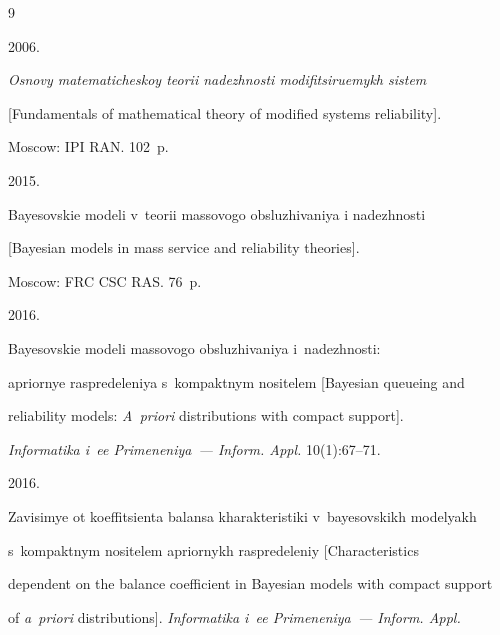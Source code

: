 {\small\frenchspacing


{%




\begin{thebibliography}{9}







 2006. 


\textit{Osnovy matematicheskoy teorii nadezhnosti modifitsiruemykh sistem} 


[Fundamentals of mathematical theory of modified systems reliability]. 


Moscow: IPI RAN. 102~p.







 2015. 


Bayesovskie modeli v~teorii massovogo obsluzhivaniya i nadezhnosti 


[Bayesian models in mass service and reliability theories]. 


Moscow: FRC CSC RAS. 76~p.







 2016. 


Bayesovskie modeli massovogo obsluzhivaniya i~nadezhnosti: 


apriornye raspredeleniya s~kompaktnym nositelem [Bayesian queueing and 


reliability models: \textit{A~priori} distributions with compact support]. 


\textit{Informatika i~ee Primeneniya~--- Inform. Appl.} 10(1):67--71.




 2016. 


Zavisimye ot koeffitsienta balansa kharakteristiki v~bayesovskikh modelyakh 


s~kompaktnym nositelem apriornykh raspredeleniy [Characteristics 


dependent on the balance coefficient in Bayesian models with compact support 


of \textit{a~priori} distributions]. \textit{Informatika i~ee Primeneniya~--- Inform. Appl.}



\end{thebibliography}}}
